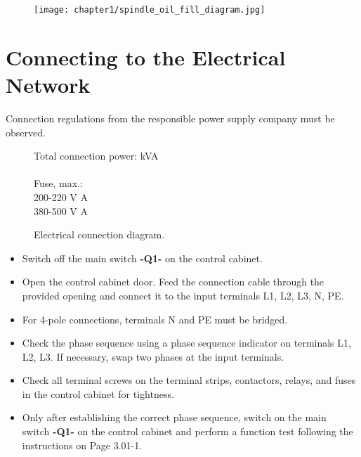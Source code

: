 \begin{figure}[h!]
    \centering
    \texttt{[image: chapter1/spindle\_oil\_fill\_diagram.jpg]} %
    \caption{}
\end{figure}


\section{Connecting to the Electrical Network}

\noindent
Connection regulations from the responsible power supply company must be observed.

\noindent
\begin{figure}[htp] %
    \centering
    \begin{minipage}[t]{.4\linewidth} %
        \centering
        \caption{Electrical connection diagram.} %
        \label{fig:electrical_connection} %
    \end{minipage}%
    \hfill %
    \begin{minipage}[t]{\dimexpr\textwidth-8cm\relax} %
        \vspace{0pt} %
        Total connection power:  kVA \\\\
        Fuse, max.: \\
        200-220 V  A \\
        380-500 V  A
    \end{minipage}
\end{figure}

\begin{itemize}
    \item Switch off the main switch \textbf{-Q1-} on the control cabinet.
    \item Open the control cabinet door. Feed the connection cable through the \\provided opening and connect it to the input terminals L1, L2, L3, N, PE.
    \item For 4-pole connections, terminals N and PE must be bridged.
    \item Check the phase sequence using a phase sequence indicator on terminals L1, L2, L3. If necessary, swap two phases at the input terminals.
    \item Check all terminal screws on the terminal strips, contactors, relays, and fuses in the control cabinet for tightness.
    \item Only after establishing the correct phase sequence, switch on the main \\switch \textbf{-Q1-} on the control cabinet and perform a function test following the instructions on Page 3.01-1.
\end{itemize}

